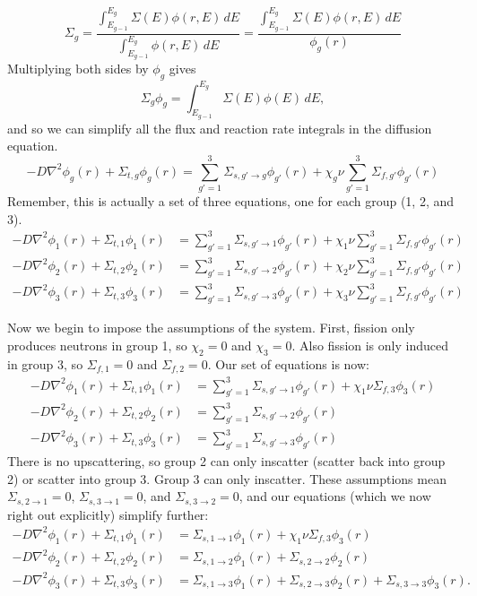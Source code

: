 \documentclass{report}
\begin{document}
\begin{enumerate}[a)]
$$ \Sigma_g = \frac{\int_{E_{g-1}}^{E_g} \Sigma(E)\phi(r,E)\,dE}{\int_{E_{g-1}}^{E_g} \phi(r,E)\,dE} = \frac{\int_{E_{g-1}}^{E_g} \Sigma(E)\phi(r,E)\,dE}{\phi_g(r)} $$
Multiplying both sides by $\phi_g$ gives
$$ \Sigma_g \phi_g = \int_{E_{g-1}}^{E_g} \Sigma(E)\phi(E)\,dE ,$$
and so we can simplify all the flux and reaction rate integrals in the diffusion equation.
$$ -D \nabla^2 \phi_g(r) + \Sigma_{t,g} \phi_g(r) = \sum_{g'=1}^3 \Sigma_{s,g' \rightarrow g}\phi_{g'}(r) + \chi_g \nu \sum_{g'=1}^3 \Sigma_{f,g'}\phi_{g'}(r) $$
Remember, this is actually a set of three equations, one for each group (1, 2, and 3).
\begin{align*}
-D \nabla^2 \phi_1(r) + \Sigma_{t,1} \phi_1(r) &= \sum_{g'=1}^3 \Sigma_{s,g' \rightarrow 1}\phi_{g'}(r) + \chi_1 \nu \sum_{g'=1}^3 \Sigma_{f,g'}\phi_{g'}(r) \\
-D \nabla^2 \phi_2(r) + \Sigma_{t,2} \phi_2(r) &= \sum_{g'=1}^3 \Sigma_{s,g' \rightarrow 2}\phi_{g'}(r) + \chi_2 \nu \sum_{g'=1}^3 \Sigma_{f,g'}\phi_{g'}(r) \\
-D \nabla^2 \phi_3(r) + \Sigma_{t,3} \phi_3(r) &= \sum_{g'=1}^3 \Sigma_{s,g' \rightarrow 3}\phi_{g'}(r) + \chi_3 \nu \sum_{g'=1}^3 \Sigma_{f,g'}\phi_{g'}(r)
\end{align*}

Now we begin to impose the assumptions of the system. First, fission only produces neutrons in group 1, so $\chi_2 = 0$ and $\chi_3 = 0$. Also fission is only induced in group 3, so $\Sigma_{f,1} = 0$ and $\Sigma_{f,2} = 0$. Our set of equations is now:
\begin{align*}
-D \nabla^2 \phi_1(r) + \Sigma_{t,1} \phi_1(r) &= \sum_{g'=1}^3 \Sigma_{s,g' \rightarrow 1}\phi_{g'}(r) + \chi_1 \nu \Sigma_{f,3}\phi_{3}(r) \\
-D \nabla^2 \phi_2(r) + \Sigma_{t,2} \phi_2(r) &= \sum_{g'=1}^3 \Sigma_{s,g' \rightarrow 2}\phi_{g'}(r) \\
-D \nabla^2 \phi_3(r) + \Sigma_{t,3} \phi_3(r) &= \sum_{g'=1}^3 \Sigma_{s,g' \rightarrow 3}\phi_{g'}(r) 
\end{align*}
There is no upscattering, so group 2 can only inscatter (scatter back into group 2) or scatter into group 3. Group 3 can only inscatter. These assumptions mean $\Sigma_{s,2 \rightarrow 1} = 0$, $\Sigma_{s,3 \rightarrow 1} = 0$, and $\Sigma_{s,3 \rightarrow 2} = 0$, and our equations (which we now right out explicitly) simplify further:
\begin{align*}
-D \nabla^2 \phi_1(r) + \Sigma_{t,1} \phi_1(r) &= \Sigma_{s,1 \rightarrow 1}\phi_1(r) + \chi_1 \nu \Sigma_{f,3}\phi_{3}(r) \\
-D \nabla^2 \phi_2(r) + \Sigma_{t,2} \phi_2(r) &= \Sigma_{s,1 \rightarrow 2}\phi_1(r) +\Sigma_{s,2 \rightarrow 2}\phi_2(r) \\
-D \nabla^2 \phi_3(r) + \Sigma_{t,3} \phi_3(r) &= \Sigma_{s,1 \rightarrow 3}\phi_{1}(r) + \Sigma_{s,2 \rightarrow 3}\phi_{2}(r) + \Sigma_{s,3 \rightarrow 3}\phi_{3}(r).\\
\end{align*}


\end{enumerate}
\end{document}
